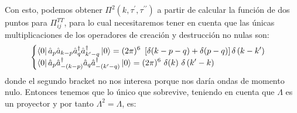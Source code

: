 Con esto, podemos obtener $\Pi^2 \left( k, \tau^\prime, \tau^{\prime \prime} \right)$ a partir de calcular la función de dos puntos para $\Pi^{TT}_{ij}$, para lo cual necesitaremos tener en cuenta que las únicas multiplicaciones de los operadores de creación y destrucción no nulas son:
\begin{equation}
    \begin{cases}
        \displaystyle \bra{0} \hat{a}_p \hat{a}_{k - p} \hat{a}^\dagger_q \hat{a}^\dagger_{k^\prime - q} \ket{0} = (2\pi)^6 ~ \left[ \delta (k - p - q) + \delta (p - q) \right] \delta \left( k - k^\prime  \right)\\
        \displaystyle \bra{0} \hat{a}_p \hat{a}^\dagger_{-(k-p)} \hat{a}_q \hat{a}^{\dagger}_{-\left( k^\prime - q \right)} \ket{0} = (2\pi)^6 ~ \delta (k) ~ \delta \left( k^\prime - k \right)
    \end{cases}
\end{equation}
donde el segundo bracket no nos interesa porque nos daría ondas de momento nulo. Entonces tenemos que lo único que sobrevive, teniendo en cuenta que $\Lambda$ es un proyector y por tanto $\Lambda^2 = \Lambda$, es:
